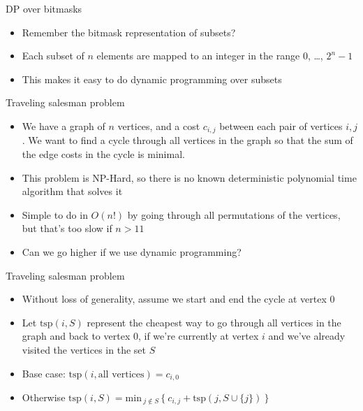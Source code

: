 \documentclass[10pt]{beamer}
\newcommand{\bi}{\begin{itemize}}
\newcommand{\ei}{\end{itemize}}
\begin{document}
\begin{frame}{DP over bitmasks}
    \vspace{40pt}
    \bi
        \item Remember the bitmask representation of subsets?
        \item Each subset of $n$ elements are mapped to an integer in the range $0$, \ldots, $2^{n} - 1$
        \item This makes it easy to do dynamic programming over subsets
    \ei
\end{frame}

\begin{frame}{Traveling salesman problem}
    \vspace{10pt}

    \bi
        \item We have a graph of $n$ vertices, and a cost $c_{i,j}$ between each pair of vertices $i, j$. We want to find a cycle through all vertices in the graph so that the sum of the edge costs in the cycle is minimal.

        \vspace{5pt}
        \item This problem is NP-Hard, so there is no known deterministic polynomial time algorithm that solves it

        \vspace{10pt}
        \item Simple to do in $O(n!)$ by going through all permutations of the vertices, but that's too slow if $n > 11$

        \vspace{10pt}
        \item Can we go higher if we use dynamic programming?
    \ei
\end{frame}

\begin{frame}{Traveling salesman problem}
    \vspace{20pt}
    \bi
\item Without loss of generality, assume we start and end the cycle at vertex $0$
    \vspace{10pt}

\item Let $\mathrm{tsp}(i, S)$ represent the cheapest way to go through all vertices in the graph and back to vertex $0$, if we're currently at vertex $i$ and we've already visited the vertices in the set $S$

    \vspace{20pt}
\item Base case: $\mathrm{tsp}(i, \textrm{all vertices}) = c_{i,0}$
\item Otherwise $\mathrm{tsp}(i, S) = \mathrm{min}_{\ j \not\in S\ } \{\ c_{i,j} + \mathrm{tsp}(j, S \cup \{j\})\ \}$
    \ei
\end{frame}
\end{document}
